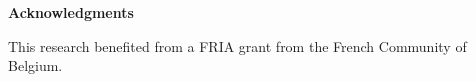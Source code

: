 \textbf{Acknowledgments}

\bigskip

This research benefited from a FRIA grant from the French Community of Belgium.

\vspace{0.4em}

